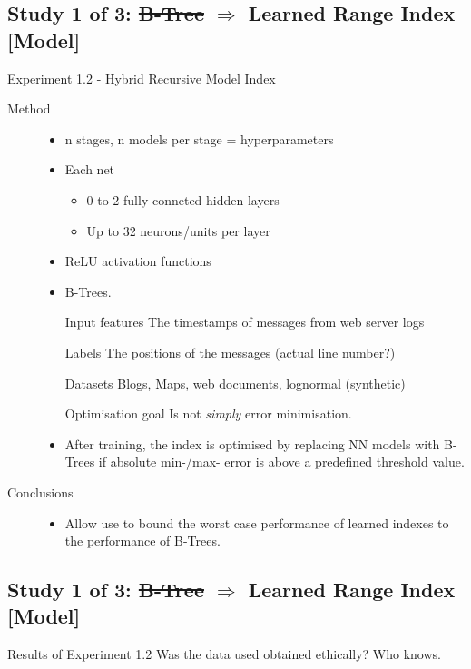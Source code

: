 \documentclass[presentation]{beamer}
\begin{document}
\subsection{Study 1 of 3: \sout{B-Tree} \(\Rightarrow\) Learned Range Index [Model]}
\label{sec:orge278fe0}
\begin{frame}[label={sec:orgd51c12e}]{Experiment 1.2 - Hybrid Recursive Model Index}
\begin{description}
\item[{Method}] \begin{itemize}
\item n stages, n models per stage = hyperparameters
\item Each net
\begin{itemize}
\item 0 to 2 fully conneted hidden-layers
\item Up to 32 neurons/units per layer
\end{itemize}
\item ReLU activation functions
\item B-Trees.
\item[{Input features}] The timestamps of messages from web server logs
\item[{Labels}] The positions of the messages (actual line number?)
\item[{Datasets}] Blogs, Maps, web documents, lognormal (synthetic)
\item[{Optimisation goal}] Is not \emph{simply} error minimisation.
\item After training, the index is optimised by replacing NN models with B-Trees if absolute min-/max- error is above a predefined threshold value.
\end{itemize}
\item[{Conclusions}] \begin{itemize}
\item Allow use to bound the worst case performance of learned indexes to the performance of B-Trees.
\end{itemize}
\end{description}
\end{frame}

\subsection{Study 1 of 3: \sout{B-Tree} \(\Rightarrow\) Learned Range Index [Model]}
\label{sec:org8c59bcd}
\begin{frame}[label={sec:org0e5915f}]{Results of Experiment 1.2}
Was the data used obtained ethically? Who knows.
\end{frame}
\end{document}
